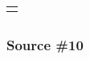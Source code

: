 \begin{longtable}[]{@{}
  >{\raggedright\arraybackslash}p{}@{}}
\midrule\noalign{}
\endhead
\bottomrule\noalign{}
\endlastfoot
\end{longtable}

\subsection{}\label{section-7}

\subsubsection{\texorpdfstring{\hfill\break
}{ }}\label{section-8}

\subsubsection{\texorpdfstring{\textbf{Source
\#10}}{Source \#10}}\label{source-10}

